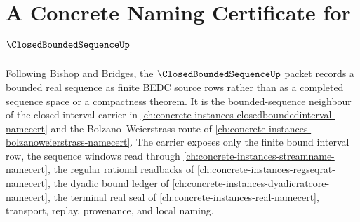 \chapter{A Concrete Naming Certificate for $\ClosedBoundedSequenceUp$}
\label{ch:concrete-instances-closed-bounded-sequence-namecert}

Following Bishop and Bridges, the $\ClosedBoundedSequenceUp$ packet records a bounded real sequence as finite BEDC source rows rather than as a completed sequence space or a compactness theorem. It is the bounded-sequence neighbour of the closed interval carrier in \autoref{ch:concrete-instances-closedboundedinterval-namecert} and the Bolzano--Weierstrass route of \autoref{ch:concrete-instances-bolzanoweierstrass-namecert}. The carrier exposes only the finite bound interval row, the sequence windows read through \autoref{ch:concrete-instances-streamname-namecert}, the regular rational readbacks of \autoref{ch:concrete-instances-regseqrat-namecert}, the dyadic bound ledger of \autoref{ch:concrete-instances-dyadicratcore-namecert}, the terminal real seal of \autoref{ch:concrete-instances-real-namecert}, transport, replay, provenance, and local naming.

